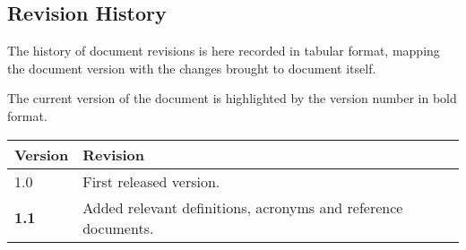 \subsection{Revision History}

The history of document revisions is here recorded in tabular format, mapping the document version with the changes brought to document itself.

The current version of the document is highlighted by the version number in bold format.

\begin{longtable}{ |l|p{7cm}| }
        \hline
        \textbf{Version} & \textbf{Revision}\\ \hline
        1.0 & First released version.\\ \hline
	\textbf{1.1} & Added relevant definitions, acronyms and reference documents. \\
	\hline
\end{longtable}
~               
